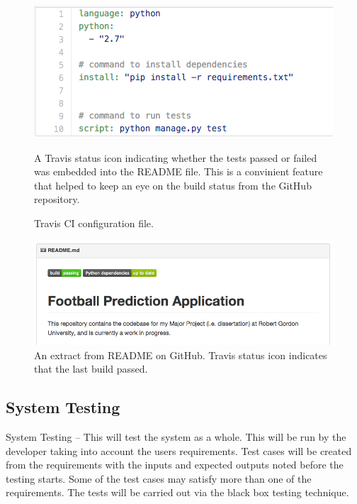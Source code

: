 \begin{figure}[H]
	\begin{center}
		\includegraphics[width=.60\linewidth,natwidth=610,natheight=540]{eval/images/travisYml}
		\caption{Travis CI configuration file.} \label{fig:using:travisyml}
\end{center}
	
A Travis status icon indicating whether the tests passed or failed was embedded into the README file. This is a convinient feature that helped to keep an eye on the build status from the GitHub repository.

\end{figure}\begin{figure}[H]
	\begin{center}
		\includegraphics[width=.90\linewidth,natwidth=610,natheight=642]{eval/images/travisBadge}
		\caption{An extract from README on GitHub. Travis status icon indicates that the last build passed.} \label{fig:using:travisbadge}
	\end{center}
\end{figure}

\subsection{System Testing}


System Testing – This will test the system as a whole. This will be run by the developer taking into account the users requirements. Test cases will be created from the requirements with the inputs and expected outputs noted before the testing starts. Some of the test cases may satisfy more than one of the requirements. The tests will be carried out via the black box testing technique.

